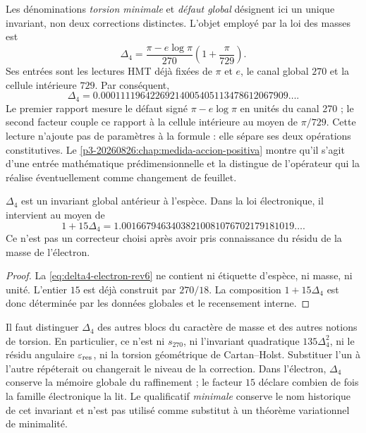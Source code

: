 Les dénominations \emph{torsion minimale} et \emph{défaut global}
désignent ici un unique invariant, non deux corrections distinctes. L'objet
employé par la loi des masses est
\begin{equation}
 \label{eq:delta4-electron-rev6}
 \boxed{
 \Delta_4
 =
 \frac{\pi-e\log\pi}{270}
 \left(1+\frac{\pi}{729}\right).}
\end{equation}
Ses entrées sont les lectures HMT déjà fixées de \(\pi\) et \(e\), le canal
global \(270\) et la cellule intérieure \(729\). Par conséquent,
\[
 \Delta_4
 =
 0.00011119642269214005405113478612067909\ldots.
\]
Le premier rapport mesure le défaut signé
\(\pi-e\log\pi\) en unités du canal 270 ; le second facteur couple ce
rapport à la cellule intérieure au moyen de \(\pi/729\). Cette lecture n'ajoute pas de
paramètres à la formule : elle sépare ses deux opérations constitutives.
Le \cref{p3-20260826:chap:medida-accion-positiva} montre qu'il s'agit d'une entrée mathématique
prédimensionnelle et la distingue de l'opérateur qui la réalise éventuellement
comme changement de feuillet.

\begin{proposition}
\label{prop:delta4-global-electron-rev6}
\(\Delta_4\) est un invariant global antérieur à l'espèce. Dans la loi
électronique, il intervient au moyen de
\[
 1+15\Delta_4
 =
 1.00166794634038210081076702179181019\ldots.
\]
Ce n'est pas un correcteur choisi après avoir pris connaissance du résidu de la masse de
l'électron.
\end{proposition}

\begin{proof}
La \cref{eq:delta4-electron-rev6} ne contient ni étiquette d'espèce, ni
masse, ni unité. L'entier \(15\) est déjà construit par \(270/18\).
La composition \(1+15\Delta_4\) est donc déterminée par les données
globales et le recensement interne.
\end{proof}

Il faut distinguer \(\Delta_4\) des autres blocs du caractère de masse et des
autres notions de torsion. En particulier, ce n'est ni \(s_{270}\), ni
l'invariant quadratique \(135\Delta_4^2\), ni le résidu angulaire
\(\varepsilon_{\rm res}\), ni la torsion géométrique de Cartan--Holst.
Substituer l'un à l'autre répéterait ou changerait le niveau de la correction. Dans
l'électron, \(\Delta_4\) conserve la mémoire globale du raffinement ; le facteur
\(15\) déclare combien de fois la famille électronique la lit. Le qualificatif
\emph{minimale} conserve le nom historique de cet invariant et n'est pas utilisé
comme substitut à un théorème variationnel de minimalité.

